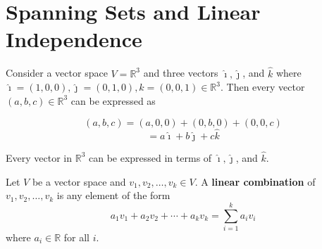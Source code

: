 \newpage
\section{Spanning Sets and Linear Independence}
Consider a vector space $V = \mathbb{R}^3$ and three vectors $\hat{\imath}, \hat{\jmath}$, and $\hat{k}$ where $\hat{\imath} = (1, 0, 0), \hat{\jmath} = (0, 1, 0), \hat{k} = (0, 0, 1) \in \mathbb{R}^3$. Then every vector $(a, b, c) \in \mathbb{R}^3$ can be expressed as 

$$(a, b, c) = (a, 0, 0) + (0, b, 0) + (0, 0, c)$$
$$=a\hat{\imath} + b\hat{\jmath} + c\hat{k}$$

Every vector in $\mathbb{R}^3$ can be expressed in terms of $\hat{\imath}, \hat{\jmath}$, and $\hat{k}$.

\begin{definition}
Let $V$ be a vector space and $v_1, v_2, \dots, v_k \in V$. A \textbf{linear combination} of $v_1, v_2, \dots, v_k$ is any element of the form
$$a_1v_1 + a_2v_2 + \cdots + a_kv_k = \sum_{i = 1}^k a_iv_i$$
where $a_i \in \mathbb{R}$ for all $i$.
\end{definition}

